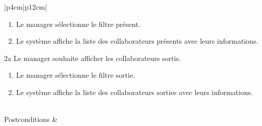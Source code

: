 \begin{longtable}{|p{4cm}|p{12cm}|}
\begin{minipage}[t]{\linewidth}
                                \begin{enumerate}[ nosep,after=\strut, ]
                                      \item Le manager sélectionne le filtre présent.  
                                      \item Le système affiche la liste des collaborateurs présents avec leurs informations.  
                                \end{enumerate}
                                2a Le manager souhaite afficher les collaborateurs sortis.
                                \begin{enumerate}[ nosep,after=\strut, ]
                                      \item Le manager sélectionne le filtre sortie.  
                                      \item Le système affiche la liste des collaborateurs sorties avec leurs informations. 
                                \end{enumerate}
                            \end{minipage}
                        \\
                        
                        \hline
                        Postconditions &   \\
                        \hline
                    \caption{Description du cas d'utilisation « Consulter la liste des collaborateurs »}\\
            \end{longtable}    
        
